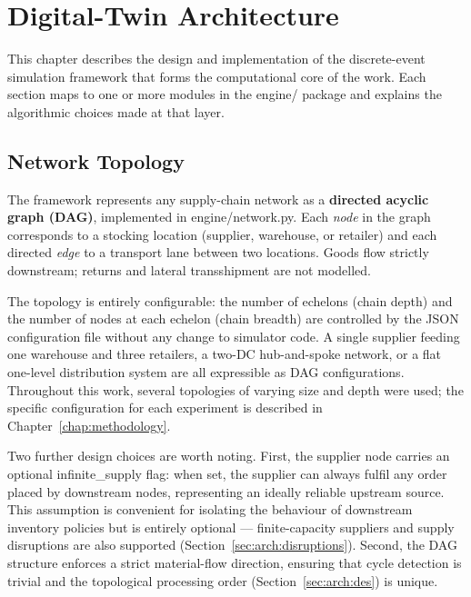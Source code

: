 \chapter{Digital-Twin Architecture}
\label{chap:architecture}

This chapter describes the design and implementation of the discrete-event
simulation framework that forms the computational core of the work.  Each
section maps to one or more modules in the engine/ package and
explains the algorithmic choices made at that layer.

\section{Network Topology}
\label{sec:arch:topology}

The framework represents any supply-chain network as a \textbf{directed
acyclic graph (DAG)}, implemented in engine/network.py.  Each
\emph{node} in the graph corresponds to a stocking location (supplier,
warehouse, or retailer) and each directed \emph{edge} to a transport lane
between two locations.  Goods flow strictly downstream; returns and lateral
transshipment are not modelled.

The topology is entirely configurable: the number of echelons (chain depth)
and the number of nodes at each echelon (chain breadth) are controlled by the
JSON configuration file without any change to simulator code.  A single
supplier feeding one warehouse and three retailers, a two-DC hub-and-spoke
network, or a flat one-level distribution system are all expressible as DAG
configurations.  Throughout this work, several topologies of varying size and
depth were used; the specific configuration for each experiment is described
in Chapter~\ref{chap:methodology}.

Two further design choices are worth noting.  First, the supplier node carries
an optional infinite\_supply flag: when set, the supplier can always
fulfil any order placed by downstream nodes, representing an ideally reliable
upstream source.  This assumption is convenient for isolating the behaviour
of downstream inventory policies but is entirely optional — finite-capacity
suppliers and supply disruptions are also supported
(Section~\ref{sec:arch:disruptions}).  Second, the DAG structure enforces a
strict material-flow direction, ensuring that cycle detection is trivial and
the topological processing order (Section~\ref{sec:arch:des}) is unique.

